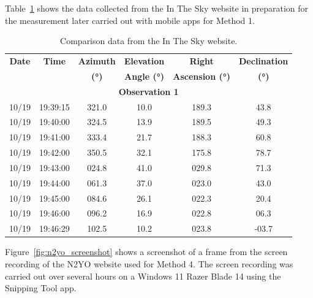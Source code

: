 \documentclass{article}
\begin{document}
Table~\ref{tab:method1_data_comparison} shows the data collected from the In The Sky website in preparation for the measurement later carried out with mobile apps for Method 1.

\begin{table}[H]
    \centering
    \caption{Comparison data from the In The Sky website.}
    \label{tab:method1_data_comparison}
    \renewcommand{\arraystretch}{1.2}
    \begin{tabular}{|c|c|c|c|c|c|}
        \hline
        \textbf{Date} & \textbf{Time} & \textbf{Azimuth} & \textbf{Elevation} & \textbf{Right} & \textbf{Declination} \\ 
        \textbf{ } & \textbf{ } & \textbf{(°)} & \textbf{Angle (°)} & \textbf{Ascension (°)} & \textbf{(°)} \\ \hline
        \multicolumn{6}{|c|}{\textbf{Observation 1}} \\ \hline
        10/19 & 19:39:15 & 321.0 & 10.0 & 189.3 & 43.8 \\ \hline
        10/19 & 19:40:00 & 324.5 & 13.9 & 189.5 & 49.3 \\ \hline
        10/19 & 19:41:00 & 333.4 & 21.7 & 188.3 & 60.8 \\ \hline
        10/19 & 19:42:00 & 350.5 & 32.1 & 175.8 & 78.7 \\ \hline
        10/19 & 19:43:00 & 024.8 & 41.0 & 029.8 & 71.3 \\ \hline
        10/19 & 19:44:00 & 061.3 & 37.0 & 023.0 & 43.0 \\ \hline
        10/19 & 19:45:00 & 084.6 & 26.1 & 022.3 & 20.4 \\ \hline
        10/19 & 19:46:00 & 096.2 & 16.9 & 022.8 & 06.3 \\ \hline
        10/19 & 19:46:29 & 102.5 & 10.2 & 023.8 & -03.7 \\ \hline
    \end{tabular}
\end{table}

\newpage
Figure~\ref{fig:n2yo_screenshot} shows a screenshot of a frame from the screen recording of the N2YO website used for Method 4. The screen recording was carried out over several hours on a Windows 11 Razer Blade 14 using the Snipping Tool app.
\end{document}
